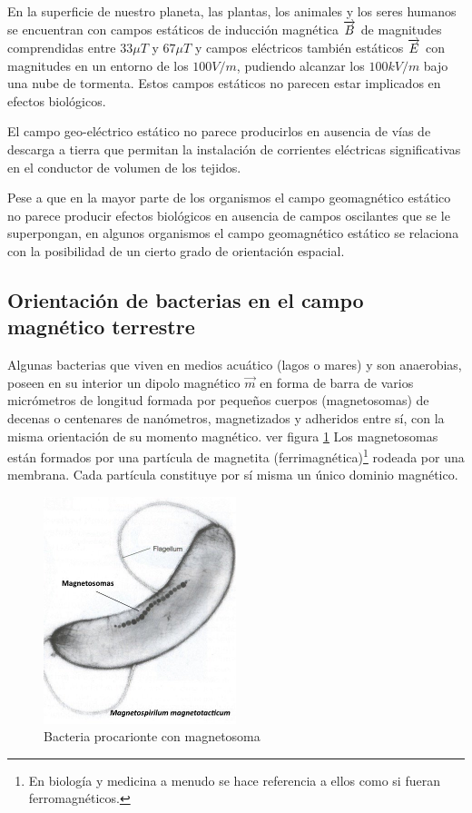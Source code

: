 En la superficie de nuestro planeta, las plantas, los animales y los seres humanos se encuentran con campos estáticos de inducción magnética $\overrightarrow{B}$ de magnitudes comprendidas entre $33\mu T$ y $67 \mu T$ y campos eléctricos también estáticos $\overrightarrow{E}$ con magnitudes en un entorno de los $100 V/m$, pudiendo alcanzar los $100 kV/m$ bajo una nube de tormenta. Estos campos estáticos no parecen estar implicados en efectos biológicos.

El campo geo-eléctrico estático no parece producirlos en ausencia de vías de descarga a tierra que permitan la instalación de corrientes eléctricas significativas en el conductor de volumen de los tejidos.

Pese a que en la mayor parte de los organismos el campo geomagnético estático no parece producir efectos biológicos en ausencia de campos oscilantes que se le superpongan, en algunos organismos el campo geomagnético estático se relaciona con la posibilidad de un cierto grado de orientación espacial.

\subsection{Orientación de bacterias en el campo magnético terrestre}

Algunas bacterias que viven en medios acuático (lagos o mares) y son anaerobias, poseen en su interior un dipolo magnético $\overrightarrow{m}$ en forma de barra de varios micrómetros de longitud formada por pequeños cuerpos (magnetosomas) de decenas o centenares de nanómetros, magnetizados y adheridos entre sí, con la misma orientación de su momento magnético. ver figura \ref{fig:magnetosoma01}
Los magnetosomas están formados por una partícula de magnetita (ferrimagnética)\footnote{En biología y medicina a menudo se hace referencia a ellos como si fueran ferromagnéticos.} rodeada por una membrana. Cada partícula constituye por sí misma un único dominio magnético.


\begin{figure}[H]
    \centering
    \includegraphics[width=0.5\textwidth]{./Figures/magnetosoma01}
	\caption{Bacteria procarionte con magnetosoma}
	\label{fig:magnetosoma01}
\end{figure}

